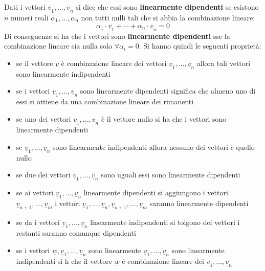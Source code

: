 \documentclass[a4paper,12pt, oneside]{book}
\begin{document}
\begin{definizione}
Dati i vettori $\underline{v}_1,...,\underline{v}_n$ si dice che essi sono \textbf{linearmente dipendenti} se esistono $n$ numeri reali $\alpha_1,...,\alpha_n$ non tutti nulli tali che si abbia la combinazione lineare:
$$\alpha_1\cdot \underline{v}_1+\cdots+\alpha_n\cdot \underline{v}_n=\underline{0}$$
Di conseguenze si ha che i vettori sono \textbf{linearmente dipendenti} sse la combinazione lineare sia nulla solo $\forall \alpha_i=0$.\newpage
Si hanno quindi le seguenti proprietà:
\begin{itemize}
\item se il vettore $\underline{v}$ è combinazione lineare dei vettori $\underline{v}_1,...,\underline{v}_n$  allora tali vettori sono linearmente indipendenti
\item se i vettori $\underline{v}_1,...,\underline{v}_n$  sono linearmente dipendenti significa che almeno uno di essi si ottiene da una combinazione lineare dei rimanenti
\item se uno dei vettori $\underline{v}_1,...,\underline{v}_n$  è il vettore nullo si ha che i vettori sono linearmente dipendenti
\item se $\underline{v}_1,...,\underline{v}_n$  sono linearmente indipendenti allora nessuno dei vettori è quello nullo
\item se due dei vettori $\underline{v}_1,...,\underline{v}_n$  sono uguali essi sono linearmente dipendenti
\item se ai vettori $\underline{v}_1,...,\underline{v}_n$ linearmente dipendenti si aggiungono i vettori $\underline{v}_{n+1},...,\underline{v}_m$ i vettori $\underline{v}_1,...,\underline{v}_n,\underline{v}_{n+1},...,\underline{v}_m$  saranno linearmente dipendenti
\item se da i vettori $\underline{v}_1,...,\underline{v}_n$  linearmente indipendenti si tolgono dei vettori i restanti saranno comunque dipendenti
\item se i vettori $\underline{w},\underline{v}_1,...,\underline{v}_n$ sono linearmente $\underline{v}_1,...,\underline{v}_n$ sono linearmente indipendenti si h che il vettore $\underline{w}$ è combinazione lineare dei $\underline{v}_1,...,\underline{v}_n$ 
\end{itemize}
\end{definizione}
\end{document}
